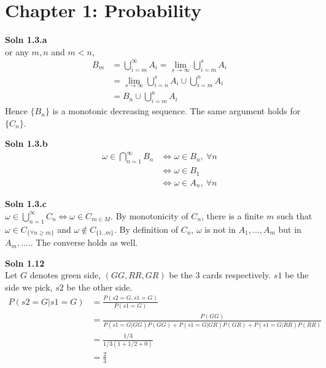 \documentclass{article}
\newcommand{\SOL}[2]{%
  \textbf{Soln #1}\\%
}
\begin{document}
\section*{Chapter 1: Probability}
\SOL{1.3.a}
For any $m, n$ and $m < n$, 
\begin{align*}
   B_m &= \bigcup^\infty_{i = m } A_i = \lim_{s\rightarrow\infty}\bigcup^s_{i=m}A_i \\
   &= \lim_{s\rightarrow\infty}\bigcup^s_{i=n}A_i \cup \bigcup^n_{i=m} A_i \\
   &= B_n \cup \bigcup^n_{i=m} A_i
\end{align*}
Hence $\{B_n\}$ is a monotonic decreasing sequence.
The same argument holds for $\{C_n\}$.

\SOL{1.3.b}
\\
\begin{align*}
	\omega \in \bigcap^{\infty}_{n=1} B_n &\Leftrightarrow \omega \in B_n, \ \forall n  \\
	&\Leftrightarrow \omega \in B_1 \\
	&\Leftrightarrow \omega \in A_n, \ \forall n
\end{align*}

\SOL{1.3.c}
\\
$\omega \in \bigcup^{\infty}_{n=1} C_n \Leftrightarrow \omega \in C_{m \in M}$.
By monotonicity of $C_n$, there is a finite $m$ such that $\omega \in C_{\{\forall n \geq m \}}$ and $\omega \not\in C_{\{1..m\}}$. By definition of $C_n$, $\omega$ is not in $A_1, ..., A_{m}$ but in $A_{m}, ....$.  The converse holds as well.

\SOL{1.12}
\\
Let $G$ denotes green side,  $(GG, RR, GR)$ be the 3 cards respectively. $s1$ be the side we pick, $s2$ be the other side. \\
\begin{align*}
P(s2=G | s1= G) &= \frac{P(s2 = G, s1 = G)}{P(s1=G)}  \\
 &= \frac{P(GG)}{P(s1 = G | GG)P(GG) + P(s1 =G | GR)P(GR) + P(s1 =G | RR)P(RR)} \\
 &= \frac{ 1/3 }{ 1/3 ( 1 + 1/2 + 0) } \\
 &= \frac{2}{3}
\end{align*}
\end{document}
